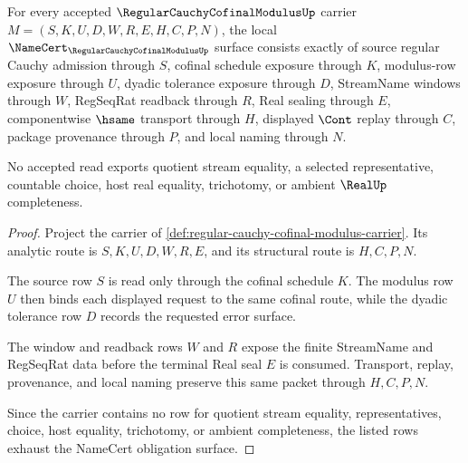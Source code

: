 \begin{theorem}
\label{thm:regular-cauchy-cofinal-modulus-namecert-obligations}
For every accepted $\RegularCauchyCofinalModulusUp$ carrier $M=(S,K,U,D,W,R,E,H,C,P,N)$, the local $\NameCert_{\RegularCauchyCofinalModulusUp}$ surface consists exactly of source regular Cauchy admission through $S$, cofinal schedule exposure through $K$, modulus-row exposure through $U$, dyadic tolerance exposure through $D$, StreamName windows through $W$, RegSeqRat readback through $R$, Real sealing through $E$, componentwise $\hsame$ transport through $H$, displayed $\Cont$ replay through $C$, package provenance through $P$, and local naming through $N$.

No accepted read exports quotient stream equality, a selected representative, countable choice, host real equality, trichotomy, or ambient $\RealUp$ completeness.
\end{theorem}
\begin{proof}
Project the carrier of \autoref{def:regular-cauchy-cofinal-modulus-carrier}. Its analytic route is $S,K,U,D,W,R,E$, and its structural route is $H,C,P,N$.

The source row $S$ is read only through the cofinal schedule $K$. The modulus row $U$ then binds each displayed request to the same cofinal route, while the dyadic tolerance row $D$ records the requested error surface.

The window and readback rows $W$ and $R$ expose the finite StreamName and RegSeqRat data before the terminal Real seal $E$ is consumed. Transport, replay, provenance, and local naming preserve this same packet through $H,C,P,N$.

Since the carrier contains no row for quotient stream equality, representatives, choice, host equality, trichotomy, or ambient completeness, the listed rows exhaust the NameCert obligation surface.
\end{proof}

